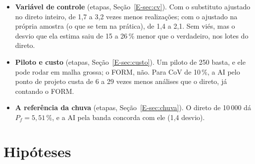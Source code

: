 \documentclass[11pt,a4paper]{article}
\begin{document}
\begin{itemize}
    variância verdadeira é a estimada, e as sementes independentes acertam o direto. A fase 4 parcial (etapas,
    Seção~\ref{E-sec:fase4}) dá 1{,}95 $\pm$ 0{,}15\,\% (8 sementes, 529 realizações) na KL; 1{,}80 $\pm$ 0{,}13\,\% (9 sementes, 564 realizações) em Nyström, contra 1{,}70\,\% do direto.
  \item \textbf{Variável de controle} (etapas, Seção~\ref{E-sec:cv}). Com o substituto ajustado no direto inteiro, de
    1{,}7 a 3{,}2 vezes menos realizações; com o ajustado na própria
    amostra (o que se tem na prática), de 1{,}4 a 2{,}1. Sem viés,
    mas o desvio que ela estima saiu de 15 a 26\,\% menor que o
    verdadeiro, nos lotes do direto.
  \item \textbf{Piloto e custo} (etapas, Seção~\ref{E-sec:custo}). Um piloto de 250 basta, e ele pode rodar em malha
    grossa; o FORM, não. Para CoV de 10\,\%, a AI pelo ponto de projeto custa de 6 a 29 vezes menos análises que
    o direto, já contando o FORM.
  \item \textbf{A referência da chuva} (etapas, Seção~\ref{E-sec:chuva}). O direto de 10\,000 dá
    $P_f = 5{,}51\,\%$, e a AI pela banda concorda com ele (1{,}4 desvio).
\end{itemize}

\section{Hipóteses}\label{sec:hip}
\end{document}
